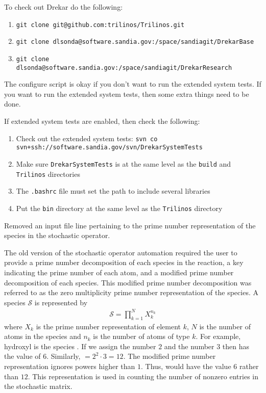 \documentclass[fontsize=11pt, %
               paper=a4, %
               oneside, %
               captions=tableheading,
               index=totoc,
               hyperref]{labbook}
\begin{document}
\begin{tcolorbox}[colback=blue!5, colframe=blue!40!black, title=Checking out Drekar]
To check out Drekar do the following:  
\small
\begin{enumerate}
  \item \texttt{git clone git@github.com:trilinos/Trilinos.git}
  \item \texttt{git clone dlsonda@software.sandia.gov:/space/sandiagit/DrekarBase}
  \item \texttt{git clone dlsonda@software.sandia.gov:/space/sandiagit/DrekarResearch}
\end{enumerate}
\normalsize
\end{tcolorbox}
The configure script is okay if you don't want to run the extended system tests.  If you want to run the extended system tests, then some extra things need to be done.
\begin{tcolorbox}[colback=blue!5, colframe=blue!40!black, title=Configuring Drekar with Extended System Tests]
If extended system tests are enabled, then check the following:
\begin{enumerate}
  \item Check out the extended system tests: \hfill \texttt{svn co svn+ssh://software.sandia.gov/svn/DrekarSystemTests} 
  \item Make sure \texttt{DrekarSystemTests} is at the same level as the \texttt{build} and \texttt{Trilinos} directories
  \item The \texttt{.bashrc} file must set the path to include several libraries
  \item Put the \texttt{bin} directory at the same level as the \texttt{Trilinos} directory
\end{enumerate}
\end{tcolorbox}

Removed an input file line pertaining to the prime number representation of the species in the stochastic operator.

The old version of the stochastic operator automation required the user to provide a prime number decomposition of each species in the reaction, a key indicating the prime number of each atom, and a modified prime number decomposition of each species.  This modified prime number decomposition was referred to as the zero multiplicity prime number representation of the species.  
A species $\mathcal{S}$ is represented by
\begin{align*}
  \mathcal{S} = \prod_{k=1}^{N}{X_{k}^{n_{k}}}
\end{align*}
where $X_{k}$ is the prime number representation of element $k$, $N$ is the number of atoms in the species and $n_{k}$ is the number of atoms of type $k$.  For example, hydroxyl is the species .  If we assign  the number $2$ and  the number $3$ then  has the value of $6$.  Similarly,  $= 2^{2}\cdot 3 = 12$.  The modified prime number representation ignores powers higher than $1$.  Thus,  would have the value $6$ rather than $12$.  This representation is used in counting the number of nonzero entries in the stochastic matrix.
\end{document}
